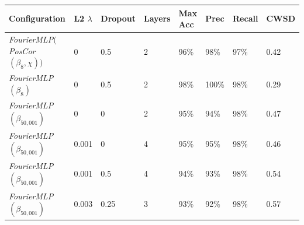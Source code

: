 \documentclass[10pt]{article}
\begin{document}
\begin{minipage}{\textwidth}
    \begin{center}
         \label{fft_wall_cuts}
        \begin{tabular}{|l|l|l|l|l|l|l|l|}
            \hline
            Configuration & L2 $\lambda$ & Dropout & Layers & Max Acc & Prec & Recall & CWSD \\
            \hline
            {\it FourierMLP}$(${\it PosCor}$(\beta_{8}, \chi))$ & 0 & 0.5 & 2 & 96\% & 98\% & 97\% & 0.42 \\
            \hline
            {\it FourierMLP}$(\beta_{8})$ & 0 & 0.5 & 2 & 98\% & 100\% & 98\% & 0.29 \\
            \hline
            {\it FourierMLP}$(\beta_{50,001})$ & 0 & 0 & 2 & 95\% & 94\% & 98\% & 0.47 \\
            \hline
            {\it FourierMLP}$(\beta_{50,001})$ & 0.001 & 0 & 4 & 95\% & 95\% & 98\% & 0.46 \\
            \hline
            {\it FourierMLP}$(\beta_{50,001})$ & 0.001 & 0.5 & 4 & 94\% & 93\% & 98\% & 0.54 \\
            \hline
            {\it FourierMLP}$(\beta_{50,001})$ & 0.003 & 0.25 & 3 & 93\% & 92\% & 98\% & 0.57 \\
            \hline
        \end{tabular}
    \end{center}
\end{minipage}
\end{document}
